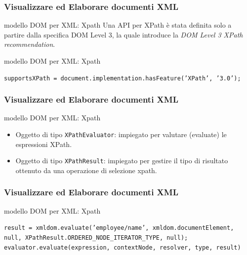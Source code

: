\begin{frame}
    \frametitle{Visualizzare ed Elaborare documenti XML}
    \addtocounter{nframe}{1}
    

    \begin{block}{modello DOM per XML: Xpath}
        Una API per XPath è stata definita solo a partire dalla specifica DOM Level 3, la quale introduce la \textit{DOM Level 3 XPath recommendation}.
    \end{block}

     \begin{block}{modello DOM per XML: Xpath}
       
       \texttt{supportsXPath = document.implementation.hasFeature('XPath', '3.0');}
        
        
     \end{block}
     
\end{frame}

\begin{frame}
    \frametitle{Visualizzare ed Elaborare documenti XML}
    \addtocounter{nframe}{1}
   
    \begin{block}{modello DOM per XML: Xpath}
        \begin{itemize}
            \item Oggetto di tipo \texttt{XPathEvaluator}: impiegato per valutare (evaluate) le espressioni XPath.
            \item Oggetto di tipo \texttt{XPathResult}: impiegato per gestire il tipo di risultato ottenuto da una operazione di selezione xpath.
        \end{itemize}
       
    \end{block}

     
\end{frame}

\begin{frame}
    \frametitle{Visualizzare ed Elaborare documenti XML}
    \addtocounter{nframe}{1}
   

     \begin{block}{modello DOM per XML: Xpath}
       
      
       \texttt{result = xmldom.evaluate('employee/name', xmldom.documentElement, null, XPathResult.ORDERED\_NODE\_ITERATOR\_TYPE, null);}
       \\\texttt{evaluator.evaluate(expression, contextNode, resolver, type, result)}
        
        
     \end{block}
     
\end{frame}


